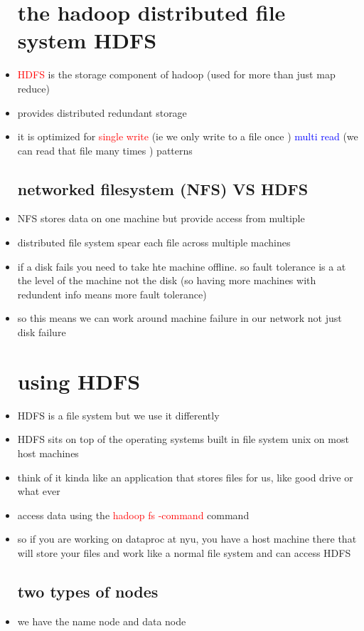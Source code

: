 \documentclass{article}
\begin{document}
\begin{itemize}
\section*{the hadoop distributed file system HDFS}
\item \textcolor{red}{HDFS} is the storage component of hadoop (used for more than just map reduce)
\item provides distributed redundant storage
\item it is optimized for \textcolor{red}{single write} (ie we only write to a file once ) \textcolor{blue}{multi read} (we can read that file many times ) patterns
\subsection*{networked filesystem (NFS) VS HDFS}
\item NFS stores data on one machine but provide access from multiple
\item distributed file system spear each file across multiple machines 
\item if a disk fails you need to take hte machine offline. so fault tolerance is a at the level of the machine not the disk (so having more machines with redundent info means more fault tolerance)
\item so this means we can work around machine failure in our network not just disk failure 
\section*{using HDFS}
\item HDFS is a file system but we use it differently 
\item HDFS sits on top of the operating systems built in file system unix on most host machines
\item think of it kinda like an application that stores files for us, like good drive or what ever 
\item access data using the \textcolor{red}{hadoop fs -command} command
\item so if you are working on dataproc at nyu, you have a host machine there that will store your files and work like a normal file system and can access HDFS
\subsection*{two types of nodes}
\item we have the name node and data node 

\end{itemize}
\end{document}
